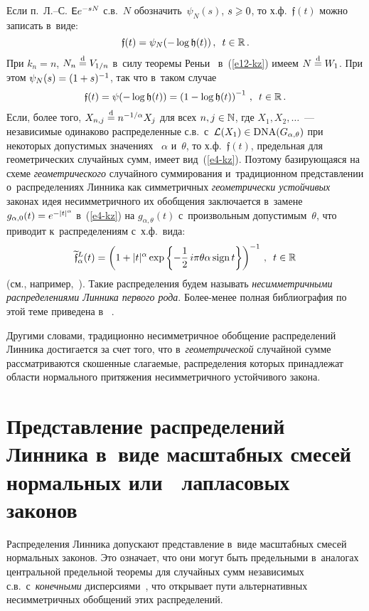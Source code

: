 \begin{multicols}{2}
Если п.~Л.--С. ${\sf E}e^{-sN}$ с.в.~$N$ обозначить~$\psi_N(s)$,
$s\hm\geqslant0$, то х.ф.~$\mathfrak{f}(t)$ можно записать в~виде:
$$
\mathfrak{f}(t)=\psi_N(-\log\mathfrak{h}(t))\,,\enskip t\in\mathbb{R}\,.
$$
При $k_n=n$, $N_n\stackrel{\mathrm{d}}{=} V_{1/n}$ в~силу теоремы Реньи~\cite{Renyi1956}
в~(\ref{e12-kz}) имеем $N\stackrel{\mathrm{d}}{=} W_1$. При этом $\psi_N(s)\hm=(1\hm+s)^{-1}$, так что 
в~таком случае
$$
\mathfrak{f}(t)=\psi(-\log\mathfrak{h}(t))=\left(1-\log\mathfrak{h}(t)\right)^{-1}\,,\enskip
t\in\mathbb{R}\,.
$$
Если, более того, $X_{n,j}\stackrel{\mathrm{d}}{=} n^{-1/\alpha}X_j$ для всех
$n,j\hm\in\mathbb{N}$, где $X_1,X_2,\ldots$~--- независимые одинаково
распределенные с.в.\ с~$\mathcal{L}(X_1)\hm\in \mathrm{DNA}(G_{\alpha,\theta})$
при некоторых допустимых значениях~ $\alpha$ и~$\theta$, то х.ф.~$\mathfrak{f}(t)$, 
предельная для геометрических случайных сумм,
имеет вид~(\ref{e4-kz}).
%
Поэтому базирующаяся на схеме \textit{геометрического} случайного
суммирования и~традиционном представлении о~распределениях Линника
как симметричных \textit{геометрически устойчивых} законах идея
несимметричного их обобщения заключается в~замене
$g_{\alpha,0}(t)\hm=e^{-|t|^{\alpha}}$ в~(\ref{e4-kz}) на $g_{\alpha,\theta}(t)$
с~произвольным допустимым~$\theta$, что приводит к~распределениям с~х.ф.\ вида:
$$
\widetilde{\mathfrak{f}}^{L}_{\alpha}(t)=
\left(1+|t|^{\alpha}\exp\left\{-
\displaystyle\frac{\displaystyle 1\mathstrut}{\displaystyle 2\mathstrut}\,i\pi\theta\alpha\,\mathrm{sign}\,t\right\}\right)^{-1}\,,\enskip
t\in\mathbb{R}
$$
(см., например,~\cite{KotzOstrovskiiHayfavi1995a,
KotzOstrovskiiHayfavi1995b}). Такие распределения будем называть 
\textit{несимметричными распределениями Линника первого рода}. Бо\-лее-ме\-нее
полная библиография по этой теме приведена в~ \cite{LimTeo2009}.

Другими словами, традиционно несимметричное обобщение распределений
Линника достигается за счет того, что в~\textit{геометрической}
случайной сумме рассматриваются скошенные слагаемые, распределения
которых принадлежат области нормального притяжения несимметричного
устойчивого закона.

\section{Представление распределений Линника в~виде масштабных
смесей нормальных или~ лапласовых законов}

Распределения Линника допускают представление в~виде масштабных
смесей нормальных законов. Это означает, что они могут быть
предельными в~аналогах центральной предельной теоремы для случайных
сумм независимых с.в.\ с~\textit{конечными} 
дисперсиями~\cite{KorolevZeifman2016a, KorolevZeifman2016b}, что открывает пути
альтернативных несимметричных обобщений этих распределений.


\end{multicols}
